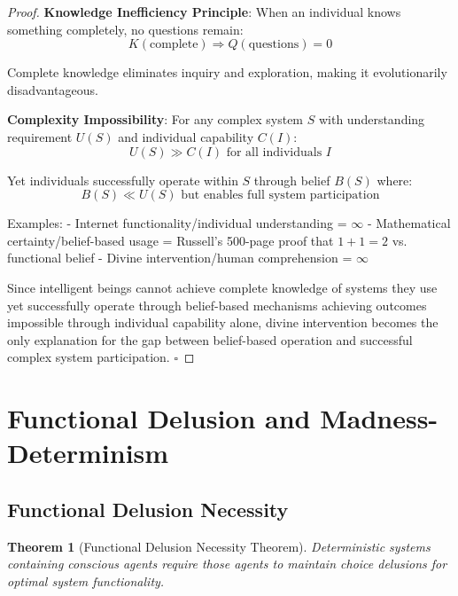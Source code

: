 \documentclass[12pt,a4paper]{article}
\newtheorem{theorem}{Theorem}[section]
\begin{document}
\begin{proof}
\textbf{Knowledge Inefficiency Principle}: When an individual knows something completely, no questions remain:
$$K(\text{complete}) \Rightarrow Q(\text{questions}) = 0$$

Complete knowledge eliminates inquiry and exploration, making it evolutionarily disadvantageous.

\textbf{Complexity Impossibility}: For any complex system $S$ with understanding requirement $U(S)$ and individual capability $C(I)$:
$$U(S) \gg C(I) \text{ for all individuals } I$$

Yet individuals successfully operate within $S$ through belief $B(S)$ where:
$$B(S) \ll U(S) \text{ but enables full system participation}$$

Examples:
- Internet functionality/individual understanding = $\infty$
- Mathematical certainty/belief-based usage = Russell's 500-page proof that $1+1=2$ vs. functional belief
- Divine intervention/human comprehension = $\infty$

Since intelligent beings cannot achieve complete knowledge of systems they use yet successfully operate through belief-based mechanisms achieving outcomes impossible through individual capability alone, divine intervention becomes the only explanation for the gap between belief-based operation and successful complex system participation. $\square$
\end{proof}

\section{Functional Delusion and Madness-Determinism}

\subsection{Functional Delusion Necessity}

\begin{theorem}[Functional Delusion Necessity Theorem]
Deterministic systems containing conscious agents require those agents to maintain choice delusions for optimal system functionality.
\end{theorem}
\end{document}
